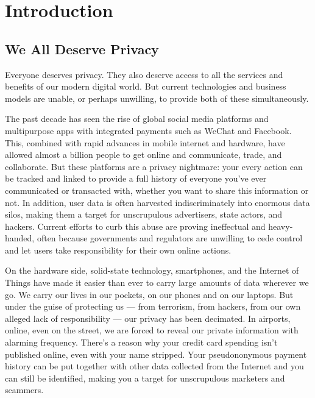 \documentclass[8pt,fleqn,openany]{book}
\begin{document}
\chapter{Introduction}\label{chap:intro}

\section{We All Deserve Privacy}
Everyone deserves privacy. They also deserve access to all the services and benefits of our modern digital world. But current technologies and business models are unable, or perhaps unwilling, to provide both of these simultaneously.
	
The past decade has seen the rise of global social media platforms and multipurpose apps with integrated payments such as WeChat and Facebook. This, combined with rapid advances in mobile internet and hardware, have allowed almost a billion people to get online and communicate, trade, and collaborate. But these platforms are a privacy nightmare: your every action can be tracked and linked to provide a full history of everyone you've ever communicated or transacted with, whether you want to share this information or not. In addition, user data is often harvested indiscriminately into enormous data silos, making them a target for unscrupulous advertisers, state actors, and hackers. Current efforts to curb this abuse are proving ineffectual and heavy-handed, often because governments and regulators are unwilling to cede control and let users take responsibility for their own online actions.

On the hardware side, solid-state technology, smartphones, and the Internet of Things have made it easier than ever to carry large amounts of data wherever we go. We carry our lives in our pockets, on our phones and on our laptops. But under the guise of protecting us — from terrorism, from hackers, from our own alleged lack of responsibility — our privacy has been decimated. In airports, online, even on the street, we are forced to reveal our private information with alarming frequency. There’s a reason why your credit card spending isn’t published online, even with your name stripped. Your pseudononymous payment history can be put together with other data collected from the Internet and you can still be identified, making you a target for unscrupulous marketers and scammers. %
\end{document}
